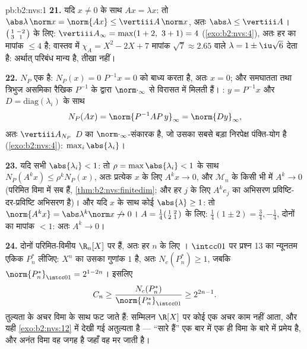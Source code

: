 \begin{solution}{pb:b2:nvs:1}
\textbf{21.} यदि $x \neq 0$ के साथ $Ax = \lambda x$: तो $\abs\lambda\,\norm x = \norm{Ax} \leq \vertiii A\,\norm x$, अतः $\abs\lambda \leq \vertiii A$। $\begin{psmallmatrix}1 & -2\\ 3 & 1\end{psmallmatrix}$ के लिए:
$\vertiii A_\infty = \max(1 + 2,\ 3 + 1) = 4$
(\cref{exo:b2:nvs:4}), अतः हर  का मापांक $\leq
4$ है; वास्तव में $\chi_A = X^2 - 2X + 7$ मापांक
$\sqrt7 \approx 2.65$ वाले $\lambda = 1 \pm
\iu\sqrt6$ देता है: अर्थात् परिबंध मान्य है, तीखा नहीं।

\textbf{22.} $N_P$ एक  है: $N_P(x) = 0$ $P^{-1}x = 0$ को बाध्य करता है, अतः $x = 0$; और
समघातता तथा त्रिभुज असमिका रैखिक $P^{-1}$ के द्वारा $\norm\cdot_\infty$ से विरासत में मिलती
हैं। : $y = P^{-1}x$ और $D = \mathrm{diag}(\lambda_i)$ के साथ
\[
N_P(Ax) = \norm{P^{-1}AP\,y}_\infty = \norm{Dy}_\infty,
\]
अतः $\vertiii A_{N_P}$ $D$ का $\norm\cdot_\infty$-संकारक  है, जो उसका सबसे बड़ा निरपेक्ष
पंक्ति-योग है (\cref{exo:b2:nvs:4}): $\max_i\abs{\lambda_i}$।

\textbf{23.} यदि सभी $\abs{\lambda_i} < 1$: तो $\rho = \max\abs{\lambda_i} < 1$ के साथ $N_P(A^kx) \leq
\rho^kN_P(x)$, अतः प्रत्येक $x$ के लिए
$A^kx
\to 0$, और $\mathcal{M}_n$ के किसी भी  में $A^k \to 0$ (परिमित विमा में सब  हैं,
\cref{thm:b2:nvs:finitedim}; और हर $j$ के लिए $A^ke_j$ का अभिसरण प्रविष्टि-दर-प्रविष्टि अभिसरण है)।
और यदि  $x$ के साथ कोई $\abs{\lambda} \geq 1$: तो $\norm{A^kx} = \abs\lambda^k\norm x
\not\to 0$। $A = \frac14\begin{psmallmatrix}1 & 2\\ 2 &
1\end{psmallmatrix}$ के लिए:
 $\frac14(1 \pm 2) =
\frac34, -\frac14$, दोनों का मापांक $< 1$: अतः $A^k \to 0$।

\textbf{24.} दोनों परिमित-विमीय $\R_n[X]$ पर  हैं, अतः हर $n$ के लिए
। $\intcc01$ पर प्रश्न 13 का न्यूनतम एकिक $P^*_n$ लीजिए: $X^n$ का उसका गुणांक
$1$ है, अतः $N_c(P^*_n) \geq 1$, जबकि $\norm{P^*_n}_{\intcc01} = 2^{1-2n}$। इसलिए
\[
C_n \geq \frac{N_c(P^*_n)}{\norm{P^*_n}_{\intcc01}}
\geq 2^{2n-1} .
\]
तुल्यता के अचर विमा के साथ फट जाते हैं: सम्मिलन $\R[X]$ पर कोई एक अचर काम
नहीं आता, और यही \cref{exo:b2:nvs:12} में देखी गई अतुल्यता है --- ``सारे  
हैं'' एक बार में एक ही विमा के बारे में प्रमेय है, और अनंत विमा वह जगह
है जहाँ वह मर जाती है।


\end{solution}
